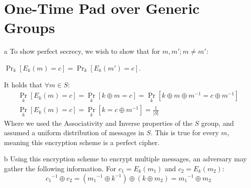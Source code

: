 \documentclass{article}
\begin{document}
\section{One-Time Pad over Generic Groups}
\begin{paragraph}
	a To show perfect secrecy, we wish to show that for ${m, m' ; m \neq m':}$

	${\Pr_k[E_k(m) = c] = \Pr_k[E_k(m') = c]}$.

	It holds that ${\forall m \in S}$:
	\begin{gather*}
		\Pr_k[E_k(m) = c] = \Pr_k[k \oplus m = c] = \Pr_k[k \oplus m \oplus m^{-1} = c \oplus m^{-1}] \\
		\Pr_k[E_k(m) = c] = \Pr_k[k = c \oplus m^{-1}] = \frac{1}{\lvert S \rvert}
	\end{gather*}
	Where we used the Associativity and Inverse properties of the ${S}$ group, and assumed a uniform distribution
	of messages in ${S}$. This is true for every ${m}$, meaning this encryption scheme is a perfect cipher.
\end{paragraph}
\begin{paragraph}
	b Using this encryption scheme to encrypt multiple messages, an adversary may gather the following information.
	For ${c_1 = E_k(m_1)}$ and ${c_2 = E_k(m_2)}$:
	\begin{equation*}
		{c_1}^{-1} \oplus c_2 = ({m_1}^{-1} \oplus k^{-1}) \oplus (k \oplus m_2) = {m_1}^{-1} \oplus m_2
	\end{equation*}
\end{paragraph}
\end{document}
